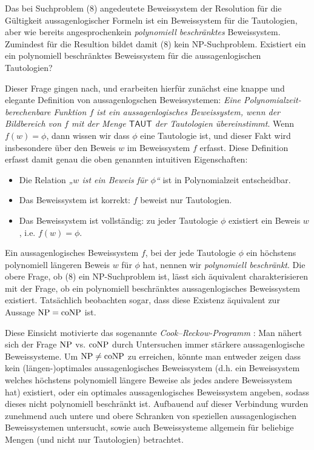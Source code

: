 Das bei Suchproblem (8) angedeutete Beweissystem der Resolution für die Gültigkeit aussagenlogischer Formeln ist ein Beweissystem für die Tautologien, aber wie bereits angesprochenkein \emph{polynomiell beschränktes} Beweissystem. Zumindest für die Resultion bildet damit (8) kein NP-Suchproblem. 
Existiert ein ein polynomiell beschränktes Beweissystem für die aussagenlogischen Tautologien?

Dieser Frage gingen \textcite{cook_relative_1979} nach, und erarbeiten hierfür zunächst eine knappe und elegante Definition von aussagenlogschen Beweissystemen: \emph{Eine Polynomialzeit-berechenbare Funktion $f$ ist ein \emph{aussagenlogisches Beweissystem}, wenn der Bildbereich von $f$ mit der Menge $\mathsf{TAUT}$ der Tautologien übereinstimmt}. Wenn $f(w)=\phi$, dann wissen wir dass $\phi$ eine Tautologie ist, und dieser Fakt wird insbesondere über den Beweis $w$ im Beweissystem $f$ erfasst. 
Diese Definition erfasst damit genau die oben genannten intuitiven Eigenschaften:
\begin{itemize}[noitemsep]
    \item Die Relation \emph{„$w$ ist ein Beweis für $\phi$“} ist in Polynomialzeit entscheidbar.
    \item Das Beweissystem ist korrekt: $f$ beweist nur Tautologien.
    \item Das Beweissystem ist vollständig: zu jeder Tautologie $\phi$ existiert ein Beweis $w$, i.e. $f(w)=\phi$.
\end{itemize}
Ein aussagenlogisches Beweissystem $f$, bei der jede Tautologie $\phi$ ein höchstens polynomiell längeren Beweis $w$ für $\phi$ hat, nennen wir \emph{polynomiell beschränkt}.
Die obere Frage, ob (8) ein NP-Suchproblem ist, lässt sich äquivalent charakterisieren mit der Frage, ob ein polynomiell beschränktes aussagenlogisches Beweissystem existiert.
Tatsächlich beobachten \citeauthor{cook_relative_1979} sogar, dass diese Existenz äquivalent zur Aussage $\mathrm{NP}=\mathrm{coNP}$ ist.

Diese Einsicht motivierte das sogenannte \emph{Cook--Reckow-Programm} \parencite{buss_lectures_1996}: Man nähert sich der Frage $\mathrm{NP}$ vs. $\mathrm{coNP}$ durch Untersuchen immer stärkere aussagenlogische Beweissysteme.
Um $\mathrm{NP}\neq\mathrm{coNP}$ zu erreichen, könnte man entweder zeigen dass kein (längen-)optimales aussagenlogisches Beweissystem (d.h. ein Beweissystem welches höchstens polynomiell längere Beweise als jedes andere Beweissystem hat) existiert, oder ein optimales aussagenlogisches Beweissystem angeben, sodass dieses nicht polynomiell beschränkt ist.
Aufbauend auf dieser Verbindung wurden zunehmend auch untere und obere Schranken von speziellen aussagenlogischen Beweissystemen untersucht, sowie auch Beweissysteme allgemein für beliebige Mengen (und nicht nur Tautologien) betrachtet.

